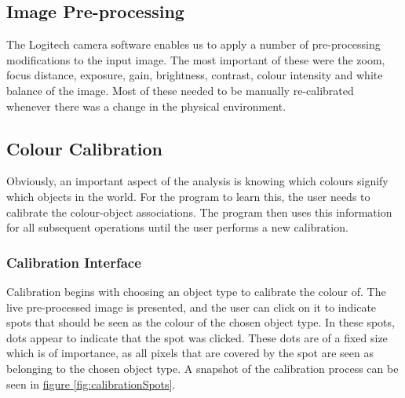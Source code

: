 \documentclass[10pt,twocolumn]{scrartcl}
\newcommand{\fref}[1]{\hyperref[#1]{figure \vref{#1}}}
\begin{document}
\subsection{Image Pre-processing}
The Logitech camera software enables us to apply a number of pre-processing modifications to the input image. The most important of these were the zoom, focus distance, exposure, gain, brightness, contrast, colour intensity and white balance of the image. Most of these needed to be manually re-calibrated whenever there was a change in the physical environment.


\subsection{Colour Calibration}
Obviously, an important aspect of the analysis is knowing which colours signify which objects in the world. For the program to learn this, the user needs to calibrate the colour-object associations. The program then uses this information for all subsequent operations until the user performs a new calibration.

\subsubsection{Calibration Interface}
Calibration begins with choosing an object type to calibrate the colour of. The live pre-processed image is presented, and the user can click on it to indicate spots that should be seen as the colour of the chosen object type. In these spots, dots appear to indicate that the spot was clicked. These dots are of a fixed size which is of importance, as all pixels that are covered by the spot are seen as belonging to the chosen object type. A snapshot of the calibration process can be seen in \fref{fig:calibrationSpots}.
\end{document}
